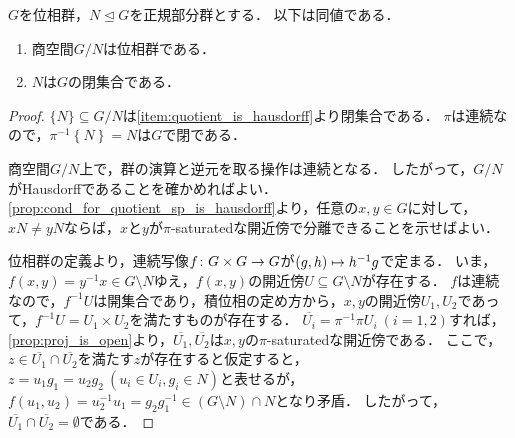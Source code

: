 \documentclass{jlreq}
\begin{document}
\begin{proposition}
  $G$を位相群，$N \trianglelefteq G$を正規部分群とする．
  以下は同値である．
  \begin{enumerate}
    \item\label{item:g/n_is_top_gp} 商空間$G/N$は位相群である．
    \item\label{item:n_is_closed} $N$は$G$の閉集合である．
  \end{enumerate}
\end{proposition}

\begin{proof}
  \implyheading{\ref{item:g/n_is_top_gp}}{\ref{item:n_is_closed}}$\{ N \} \subseteq G/N$は\cref{item:quotient_is_hausdorff}より閉集合である．
  $\pi$は連続なので，$\pi^{-1} \left\{ N \right\} = N$は$G$で閉である．

  \implyheading{\ref{item:n_is_closed}}{\ref{item:g/n_is_top_gp}}商空間$G/N$上で，群の演算と逆元を取る操作は連続となる．
  したがって，$G/N$がHausdorffであることを確かめればよい．
  \cref{prop:cond_for_quotient_sp_is_hausdorff}より，任意の$x, y \in G$に対して，$xN \ne yN$ならば，$x$と$y$が$\pi$-saturatedな開近傍で分離できることを示せばよい．

  位相群の定義より，連続写像$f \colon G \times G \to G$が$\tuple{g, h} \mapsto h^{-1}g$で定まる．
  いま，$f(x, y) = y^{-1}x \in G \setminus N$ゆえ，$f(x, y)$の開近傍$U \subseteq G \setminus N$が存在する．
  $f$は連続なので，$f^{-1} U$は開集合であり，積位相の定め方から，$x, y$の開近傍$U_1, U_2$であって，$f^{-1} U = U_1 \times U_2$を満たすものが存在する．
  $\overline{U_i} = \pi^{-1} \pi U_i\ (i = 1, 2)$すれば，\cref{prop:proj_is_open}より，$\overline{U_1}, \overline{U_2}$は$x, y$の$\pi$-saturatedな開近傍である．
  ここで，$z \in \overline{U_1} \cap \overline{U_2}$を満たす$z$が存在すると仮定すると，$z = u_1 g_1 = u_2 g_2\ (u_i \in U_i, g_i \in N)$と表せるが，$f(u_1, u_2) = u_2^{-1} u_1 = g_2 g_1^{-1} \in (G \setminus N) \cap N$となり矛盾．
  したがって，$\overline{U_1} \cap \overline{U_2} = \emptyset$である．
\end{proof}

\printindex
\end{document}
